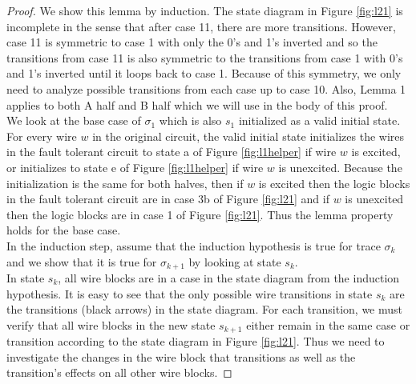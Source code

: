 \documentclass[12pt]{report}
\begin{document}
\begin{proof}
We show this lemma by induction.  The state diagram in Figure \ref{fig:l21} is incomplete in the sense that after case 11, there are more transitions.  However, case 11 is symmetric to case 1 with only the 0's and 1's inverted and so the transitions from case 11 is also symmetric to the transitions from case 1 with 0's and 1's inverted until it loops back to case 1.  Because of this symmetry, we only need to analyze possible transitions from each case up to case 10.  Also, Lemma 1 applies to both A half and B half which we will use in the body of this proof.\\

We look at the base case of $\sigma_1$ which is also $s_1$ initialized as a valid initial state.  For every wire $w$ in the original circuit, the valid initial state initializes the wires in the fault tolerant circuit to state a of Figure \ref{fig:l1helper} if wire $w$ is excited, or initializes to state e of Figure \ref{fig:l1helper} if wire $w$ is unexcited.  Because the initialization is the same for both halves, then if $w$ is excited then the logic blocks in the fault tolerant circuit are in case 3b of Figure \ref{fig:l21} and if $w$ is unexcited then the logic blocks are in case 1 of Figure \ref{fig:l21}.  Thus the lemma property holds for the base case. \\

In the induction step, assume that the induction hypothesis is true for trace $\sigma_k$ and we show that it is true for $\sigma_{k+1}$ by looking at state $s_k$.  \\

In state $s_k$, all wire blocks are in a case in the state diagram from the induction hypothesis.  It is easy to see that the only possible wire transitions in state $s_k$ are the transitions (black arrows) in the state diagram.  
For each transition, we must verify that all wire blocks in the new state $s_{k+1}$ either remain in the same case or transition according to the state diagram in Figure \ref{fig:l21}.  Thus we need to investigate the changes in the wire block that transitions as well as the transition's effects on all other wire blocks. 


\end{proof}
\end{document}
